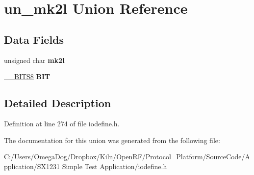 \hypertarget{unionun__mk2l}{\section{un\-\_\-mk2l Union Reference}
\label{unionun__mk2l}
}
\subsection*{Data Fields}
\begin{DoxyCompactItemize}
\item 
\hypertarget{unionun__mk2l_a013e4bf4d23a5fcaa13216365d1c89e1}{unsigned char {\bfseries mk2l}}\label{unionun__mk2l_a013e4bf4d23a5fcaa13216365d1c89e1}

\item 
\hypertarget{unionun__mk2l_a6e9a724eeca10a76cf70e124593bf88e}{\hyperlink{struct_____b_i_t_s8}{\-\_\-\-\_\-\-B\-I\-T\-S8} {\bfseries B\-I\-T}}\label{unionun__mk2l_a6e9a724eeca10a76cf70e124593bf88e}

\end{DoxyCompactItemize}


\subsection{Detailed Description}


Definition at line 274 of file iodefine.\-h.



The documentation for this union was generated from the following file\-:\begin{DoxyCompactItemize}
\item 
C\-:/\-Users/\-Omega\-Dog/\-Dropbox/\-Kiln/\-Open\-R\-F/\-Protocol\-\_\-\-Platform/\-Source\-Code/\-Application/\-S\-X1231 Simple Test Application/iodefine.\-h\end{DoxyCompactItemize}
